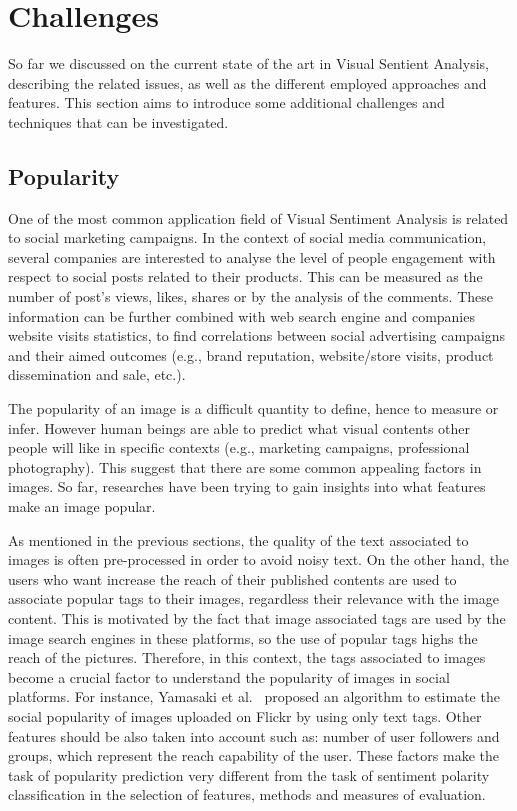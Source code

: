 \section{Challenges}\label{challenges}
So far we discussed on the current state of the art in Visual Sentient Analysis, describing the related issues, as well as the different employed approaches and features.
This section aims to introduce some additional challenges and techniques that can be investigated.

\subsection{Popularity}\label{csurPopularity}
One of the most common application field of Visual Sentiment Analysis is related to social marketing campaigns. In the context of social media communication, several companies are interested to analyse the level of people engagement with respect to social posts related to their products. This can be measured as the number of post's views, likes, shares or by the analysis of the comments. These information can be further combined with web search engine and companies website visits statistics, to find correlations between social advertising campaigns and their aimed outcomes (e.g., brand reputation, website/store visits, product dissemination and sale, etc.).

The popularity of an image is a difficult quantity to define, hence to measure or infer. 
However human beings are able to predict what visual contents other people will like in specific contexts (e.g., marketing campaigns, professional photography). This suggest that there are some common appealing factors in images.
So far, researches have been trying to gain insights into what features make an image popular.

As mentioned in the previous sections, the quality of the text associated to images is often pre-processed in order to avoid noisy text. 
On the other hand, the users who want increase the reach of their published contents are used to associate popular tags to their images, regardless their relevance with the image content. This is motivated by the fact that image associated tags are used by the image search engines in these platforms, so the use of popular tags highs the reach of the pictures.
Therefore, in this context, the tags associated to images become a crucial factor to understand the popularity of images in social platforms.
For instance, Yamasaki et al.~\cite{yamasaki2014social} proposed an algorithm to estimate the social popularity of images uploaded on Flickr by using only text tags.
Other features should be also taken into account such as: number of user followers and groups, which represent the reach capability of the user. These factors make the task of popularity prediction very different from the task of sentiment polarity classification in the selection of features, methods and measures of evaluation.

